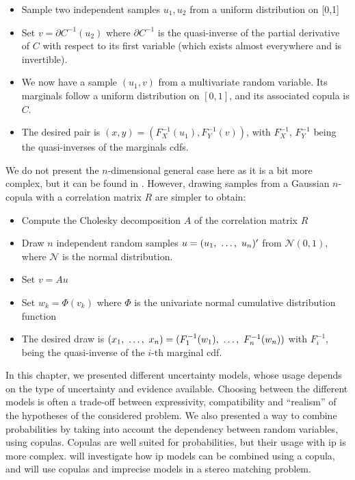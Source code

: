\begin{itemize}
    \item Sample two independent samples $u_1, u_2$ from a uniform distribution on [0,1]
    \item Set $v=\partial C^{-1}(u_2)$ where $\partial C^{-1}$ is the quasi-inverse of the partial derivative of $C$ with respect to its first variable (which exists almost everywhere and is invertible).
    \item We now have a sample $(u_1, v)$ from a multivariate random variable. Its marginals follow a uniform distribution on $[0,1]$, and its associated copula is $C$.
    \item The desired pair is $(x,y) = (F^{-1}_X(u_1), F^{-1}_Y(v))$, with $F_X^{-1}$, $F_Y^{-1}$ being the quasi-inverses of the marginals \acrshort{cdf}s.
\end{itemize}

We do not present the $n$-dimensional general case here as it is a bit more complex, but it can be found in \cite{cherubini_copula_2004}. However, drawing samples from a Gaussian $n$-copula with a correlation matrix $R$ are simpler to obtain:
\begin{itemize}
    \item Compute the Cholesky decomposition $A$ of the correlation matrix $R$
    \item Draw $n$ independent random samples $u=(u_1, ~\ldots, ~ u_n)'$ from $\mathcal{N}(0,1)$, where $\mathcal{N}$ is the normal distribution.
    \item Set $v=Au$
    \item Set $w_k=\Phi(v_k)$ where $\Phi$ is the univariate normal cumulative distribution function
    \item The desired draw is $(x_1, ~\ldots, ~ x_n)=(F^{-1}_1(w_1), ~\ldots, ~ F^{-1}_n(w_n))$ with $F_i^{-1}$, being the quasi-inverse of the $i$-th marginal \acrshort{cdf}.
\end{itemize}

\begin{conclusion}
    In this chapter, we presented different uncertainty models, whose usage depends on the type of uncertainty and evidence available.  Choosing between the different models is often a trade-off between expressivity, compatibility and ``realism'' of the hypotheses of the considered problem. We also presented a way to combine probabilities by taking into account the dependency between random variables, using copulas. Copulas are well suited for probabilities, but their usage with \acrshort{ip} is more complex.  will investigate how \acrshort{ip} models can be combined using a copula, and  will use copulas and imprecise models in a stereo matching problem.
\end{conclusion}

\clearpage